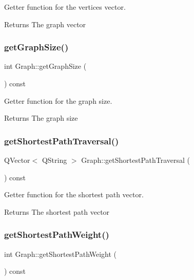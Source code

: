 Getter function for the vertices vector. 

\begin{DoxyReturn}{Returns}
The graph vector 
\end{DoxyReturn}
\mbox{\label{class_graph_af3da8365315d5435f490d48081cd5e42}} 
\subsubsection{\texorpdfstring{get\+Graph\+Size()}{getGraphSize()}}
{\footnotesize\ttfamily int Graph\+::get\+Graph\+Size (\begin{DoxyParamCaption}{ }\end{DoxyParamCaption}) const}



Getter function for the graph size. 

\begin{DoxyReturn}{Returns}
The graph size 
\end{DoxyReturn}
\mbox{\label{class_graph_ace289afb1c130cf4db09e4d1f2180d67}} 
\subsubsection{\texorpdfstring{get\+Shortest\+Path\+Traversal()}{getShortestPathTraversal()}}
{\footnotesize\ttfamily Q\+Vector$<$ Q\+String $>$ Graph\+::get\+Shortest\+Path\+Traversal (\begin{DoxyParamCaption}{ }\end{DoxyParamCaption}) const}



Getter function for the shortest path vector. 

\begin{DoxyReturn}{Returns}
The shortest path vector 
\end{DoxyReturn}
\mbox{\label{class_graph_a63c083974789c0b7259339c574901228}} 
\subsubsection{\texorpdfstring{get\+Shortest\+Path\+Weight()}{getShortestPathWeight()}}
{\footnotesize\ttfamily int Graph\+::get\+Shortest\+Path\+Weight (\begin{DoxyParamCaption}{ }\end{DoxyParamCaption}) const}



